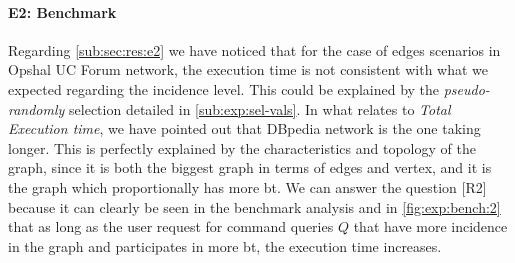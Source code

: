 \paragraph{E2: Benchmark} Regarding \autoref{sub:sec:res:e2} we have noticed that for the case of edges scenarios in Opshal UC Forum network, the execution time is not consistent with what we expected regarding the incidence level. This could be explained by the \emph{pseudo-randomly} selection detailed in \autoref{sub:exp:sel-vals}.
In what relates to \emph{Total Execution time}, we have pointed out that DBpedia network is the one taking longer. This is perfectly explained by the characteristics and topology of the graph, since it is both the biggest graph in terms of edges and vertex, and it is the graph which proportionally has more \acrshort{bt}. 
We can answer the question [R2] because it can clearly be seen in the benchmark analysis and in \autoref{fig:exp:bench:2} that as long as the user request for command queries $Q$ that have more incidence in the graph and participates in more \acrshort{bt},
the execution time increases.



